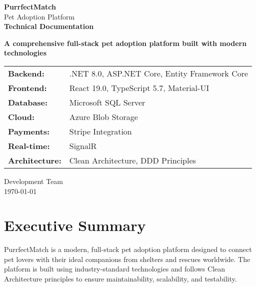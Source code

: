 \documentclass[12pt,a4paper]{article}
\begin{document}
\begin{titlepage}
    \centering
    \vspace*{2cm}
    
    {\Huge\bfseries\color{primaryblue} PurrfectMatch}\\[0.5cm]
    {\Large\color{secondarygreen} Pet Adoption Platform}\\[2cm]
    
    {\huge\bfseries Technical Documentation}\\[1cm]
    
    \begin{tcolorbox}[colback=lightgray, colframe=primaryblue, width=0.8\textwidth]
        \centering
        \textbf{A comprehensive full-stack pet adoption platform built with modern technologies}\\[0.5cm]
        
        \begin{tabular}{@{}ll@{}}
            \textbf{Backend:} & .NET 8.0, ASP.NET Core, Entity Framework Core \\
            \textbf{Frontend:} & React 19.0, TypeScript 5.7, Material-UI \\
            \textbf{Database:} & Microsoft SQL Server \\
            \textbf{Cloud:} & Azure Blob Storage \\
            \textbf{Payments:} & Stripe Integration \\
            \textbf{Real-time:} & SignalR \\
            \textbf{Architecture:} & Clean Architecture, DDD Principles
        \end{tabular}
    \end{tcolorbox}
    
    \vfill
    
    {\Large Development Team}\\[0.5cm]
    {\large \today}
\end{titlepage}

\newpage
\tableofcontents
\newpage

\section{Executive Summary}

PurrfectMatch is a modern, full-stack pet adoption platform designed to connect pet lovers with their ideal companions from shelters and rescues worldwide. The platform is built using industry-standard technologies and follows Clean Architecture principles to ensure maintainability, scalability, and testability.
\end{document}
